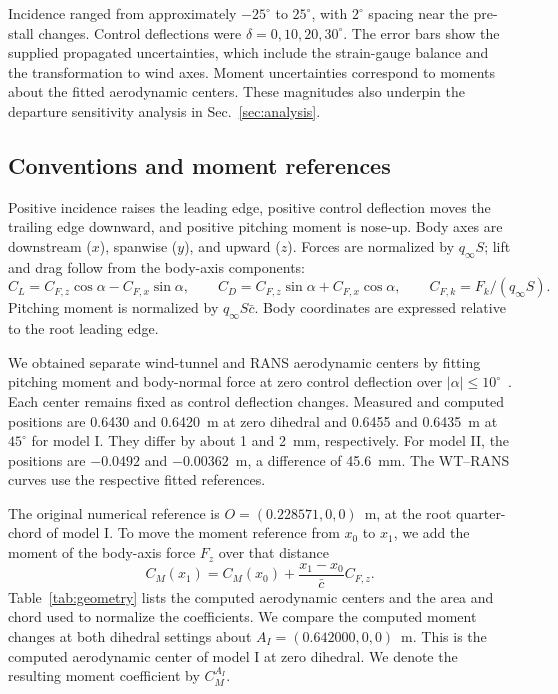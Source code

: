 \documentclass[journal]{new-aiaa}
\newcommand{\degc}{^\circ}
\begin{document}
\label{anchor:wt_uncertainty}Incidence ranged from approximately $-25\degc$ to $25\degc$, with $2\degc$ spacing near the pre-stall changes. Control deflections were $\delta=0,10,20,30\degc$. The error bars show the supplied propagated uncertainties, which include the strain-gauge balance and the transformation to wind axes. Moment uncertainties correspond to moments about the fitted aerodynamic centers. These magnitudes also underpin the departure sensitivity analysis in Sec.~\ref{sec:analysis}.

\label{end:sec:setup}
\subsection{Conventions and moment references}\label{sec:references}
Positive incidence raises the leading edge, positive control deflection moves the trailing edge downward, and positive pitching moment is nose-up. Body axes are downstream ($x$), spanwise ($y$), and upward ($z$). Forces are normalized by $q_\infty S$; lift and drag follow from the body-axis components:
\begin{equation}
 C_L=C_{F,z}\cos\alpha-C_{F,x}\sin\alpha,\qquad
 C_D=C_{F,z}\sin\alpha+C_{F,x}\cos\alpha,\qquad
 C_{F,k}=F_k/(q_\infty S).
\label{eq:force}
\end{equation}
Pitching moment is normalized by $q_\infty S\bar c$. Body coordinates are expressed relative to the root leading edge.

\label{anchor:fitted_reference}We obtained separate wind-tunnel and RANS aerodynamic centers by fitting pitching moment and body-normal force at zero control deflection over $|\alpha|\leq10\degc$~\cite{rausa2026monnalisa}. Each center remains fixed as control deflection changes. Measured and computed positions are 0.6430 and 0.6420~m at zero dihedral and 0.6455 and 0.6435~m at $45\degc$ for model I. They differ by about 1 and 2~mm, respectively. For model II, the positions are $-0.0492$ and $-0.00362$~m, a difference of 45.6~mm. The WT--RANS curves use the respective fitted references.

The original numerical reference is $O=(0.228571,0,0)$~m, at the root quarter-chord of model I. To move the moment reference from $x_0$ to $x_1$, we add the moment of the body-axis force $F_z$ over that distance
\begin{equation}
 C_M(x_1)=C_M(x_0)+\frac{x_1-x_0}{\bar c}C_{F,z}.
\label{eq:transport}
\end{equation}
Table~\ref{tab:geometry} lists the computed aerodynamic centers and the area and chord used to normalize the coefficients. We compare the computed moment changes at both dihedral settings about $A_I=(0.642000,0,0)$~m. This is the computed aerodynamic center of model I at zero dihedral. We denote the resulting moment coefficient by $C_M^{A_I}$.
\end{document}
